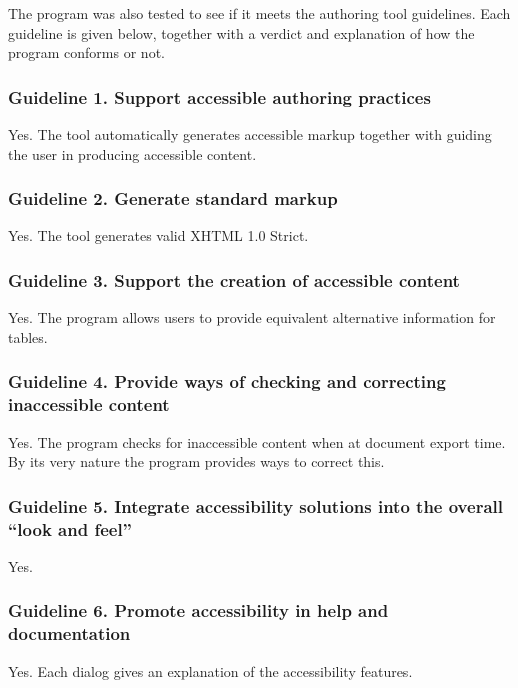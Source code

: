The program was also tested to see if it meets the authoring tool
guidelines\cite{w3c:atag}. Each guideline is given below, together with
a verdict and explanation of how the program conforms or not.

\subsubsection{Guideline 1. Support accessible authoring practices}

Yes. The tool automatically generates accessible markup together with 
guiding the user in producing accessible content.

\subsubsection{Guideline 2. Generate standard markup}

Yes. The tool generates valid XHTML 1.0 Strict.

\subsubsection{Guideline 3. Support the creation of accessible content}

Yes. The program allows users to provide equivalent alternative
information for tables.

\subsubsection{Guideline 4. Provide ways of checking and correcting inaccessible content}

Yes. The program checks for inaccessible content when at document export time. By its
very nature the program provides ways to correct this.

\subsubsection{Guideline 5. Integrate accessibility solutions into the overall ``look and feel''}

Yes.

\subsubsection{Guideline 6. Promote accessibility in help and documentation}

Yes. Each dialog gives an explanation of the accessibility features.

